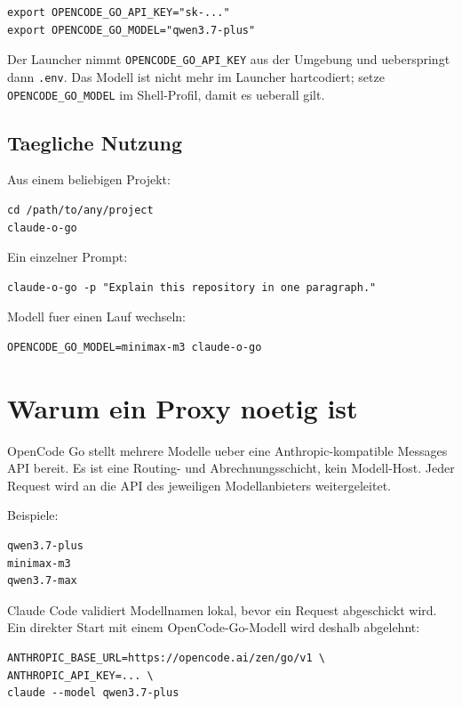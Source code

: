 \documentclass[11pt,a4paper]{article}
\newcommand{\code}[1]{\texttt{#1}}
\begin{document}
\begin{verbatim}
export OPENCODE_GO_API_KEY="sk-..."
export OPENCODE_GO_MODEL="qwen3.7-plus"
\end{verbatim}

Der Launcher nimmt \code{OPENCODE\_GO\_API\_KEY} aus der Umgebung und
ueberspringt dann \code{.env}. Das Modell ist nicht mehr im Launcher
hartcodiert; setze \code{OPENCODE\_GO\_MODEL} im Shell-Profil, damit es ueberall
gilt.

\subsection{Taegliche Nutzung}

Aus einem beliebigen Projekt:

\begin{verbatim}
cd /path/to/any/project
claude-o-go
\end{verbatim}

Ein einzelner Prompt:

\begin{verbatim}
claude-o-go -p "Explain this repository in one paragraph."
\end{verbatim}

Modell fuer einen Lauf wechseln:

\begin{verbatim}
OPENCODE_GO_MODEL=minimax-m3 claude-o-go
\end{verbatim}

\section{Warum ein Proxy noetig ist}

OpenCode Go stellt mehrere Modelle ueber eine Anthropic-kompatible Messages API
bereit. Es ist eine Routing- und Abrechnungsschicht, kein Modell-Host. Jeder
Request wird an die API des jeweiligen Modellanbieters weitergeleitet.

Beispiele:

\begin{verbatim}
qwen3.7-plus
minimax-m3
qwen3.7-max
\end{verbatim}

Claude Code validiert Modellnamen lokal, bevor ein Request abgeschickt wird.
Ein direkter Start mit einem OpenCode-Go-Modell wird deshalb abgelehnt:

\begin{verbatim}
ANTHROPIC_BASE_URL=https://opencode.ai/zen/go/v1 \
ANTHROPIC_API_KEY=... \
claude --model qwen3.7-plus
\end{verbatim}
\end{document}
